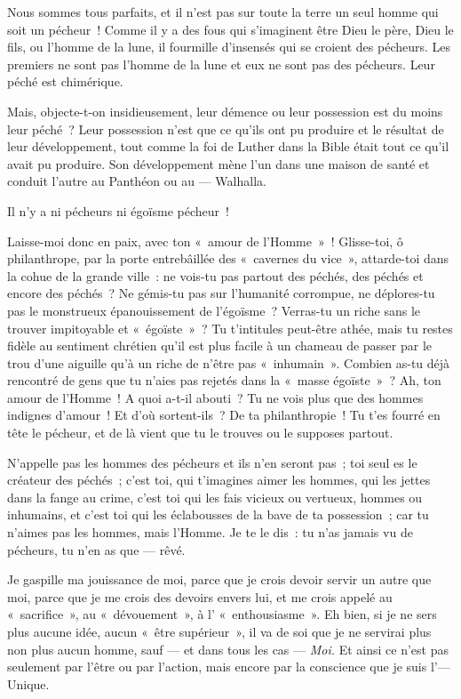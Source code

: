 \documentclass[french,twoside]{book} %
\begin{document}
Nous sommes tous parfaits, et il n’est pas sur toute la terre un seul homme qui soit un pécheur ! Comme il y a des fous qui s’imaginent être Dieu le père, Dieu le fils, ou l’homme de la lune, il fourmille d’insensés qui se croient des pécheurs. Les premiers ne sont pas l’homme de la lune et eux ne sont pas des pécheurs. Leur péché est chimérique.\par
Mais, objecte-t-on insidieusement, leur démence ou leur possession est du moins leur péché ? Leur possession n’est que ce qu’ils ont pu produire et le résultat de leur développement, tout comme la foi de Luther dans la Bible était tout ce qu’il avait pu produire.  Son développement mène l’un dans une maison de santé et conduit l’autre au Panthéon ou au — Walhalla.\par
Il n’y a ni pécheurs ni égoïsme pécheur !\par
Laisse-moi donc en paix, avec ton « amour de l’Homme » ! Glisse-toi, ô philanthrope, par la porte entrebâillée des « cavernes du vice », attarde-toi dans la cohue de la grande ville : ne vois-tu pas partout des péchés, des péchés et encore des péchés ? Ne gémis-tu pas sur l’humanité corrompue, ne déplores-tu pas le monstrueux épanouissement de l’égoïsme ? Verras-tu un riche sans le trouver impitoyable et « égoïste » ? Tu t’intitules peut-être athée, mais tu restes fidèle au sentiment chrétien qu’il est plus facile à un chameau de passer par le trou d’une aiguille qu’à un riche de n’être pas « inhumain ». Combien as-tu déjà rencontré de gens que tu n’aies pas rejetés dans la « masse égoïste » ? Ah, ton amour de l’Homme ! A quoi a-t-il abouti ? Tu ne vois plus que des hommes indignes d’amour ! Et d’où sortent-ils ? De ta philanthropie ! Tu t’es fourré en tête le pécheur, et de là vient que tu le trouves ou le supposes partout.\par
N’appelle pas les hommes des pécheurs et ils n’en seront pas ; toi seul es le créateur des péchés ; c’est toi, qui t’imagines aimer les hommes, qui les jettes dans la fange au crime, c’est toi qui les fais vicieux ou vertueux, hommes ou inhumains, et c’est toi qui les éclabousses de la bave de ta possession ; car tu n’aimes pas les hommes, mais l’Homme. Je te le dis : tu n’as jamais vu de pécheurs, tu n’en as que — rêvé.\par
Je gaspille ma jouissance de moi, parce que je crois devoir servir un autre que moi, parce que je me crois des devoirs envers lui, et me crois appelé au « sacrifice », au « dévouement », à l’ « enthousiasme ». Eh bien, si je ne sers plus aucune idée, aucun « être supérieur », il va de soi que je ne servirai plus non plus aucun homme, sauf — et dans tous les cas — \emph{Moi.} Et ainsi ce n’est pas seulement par l’être  ou par l’action, mais encore par la conscience que je suis l’— Unique.\par
\end{document}
